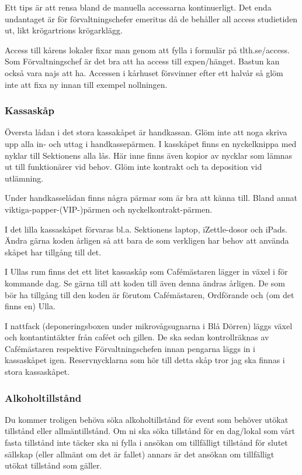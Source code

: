 \documentclass[10pt]{article}
\begin{document}
Ett tips är att rensa bland de manuella accessarna kontinuerligt. Det enda undantaget är för förvaltningschefer emeritus då de behåller all access studietiden ut, likt krögartrions krögarklägg.

Access till kårens lokaler fixar man genom att fylla i formulär på tlth.se/access. Som Förvaltningschef är det bra att ha access till expen/hänget. Bastun kan också vara najs att ha. Accessen i kårhuset försvinner efter ett halvår så glöm inte att fixa ny innan till exempel nollningen.

\subsubsection{Kassaskåp}
Översta lådan i det stora kassakåpet är handkassan. Glöm inte att noga skriva upp alla in- och uttag i handkassepärmen. I kasskåpet finns en nyckelknippa med nyklar till Sektionens alla lås. Här inne finns även kopior av nycklar som lämnas ut till funktionärer vid behov. Glöm inte kontrakt och ta deposition vid utlämning.

Under handkasselådan finns några pärmar som är bra att känna till. Bland annat viktiga-papper-(VIP-)pärmen och nyckelkontrakt-pärmen. 

I det lilla kassaskåpet förvaras bl.a. Sektionens laptop, iZettle-dosor och iPads. Ändra gärna koden årligen så att bara de som verkligen har behov att använda skåpet har tillgång till det. 

I Ullas rum finns det ett litet kassaskåp som Cafémästaren lägger in växel i för kommande dag. Se gärna till att koden till även denna ändras årligen. De som bör ha tillgång till den koden är förutom Cafémästaren, Ordförande och (om det finns en) Ulla.

I nattfack (deponeringsboxen under mikrovågsugnarna i Blå Dörren) läggs växel och kontantintäkter från caféet och gillen. De ska sedan kontrollräknas av Cafémästaren respektive Förvaltningschefen innan pengarna läggs in i kassaskåpet igen. 
Reservnycklarna som hör till detta skåp tror jag ska finnas i stora kassaskåpet.

\subsubsection{Alkoholtillstånd}
Du kommer troligen behöva söka alkoholtillstånd för event som behöver utökat tillstånd eller allmäntillstånd. Om ni ska söka tillstånd för en dag/lokal som vårt fasta tillstånd inte täcker ska ni fylla i ansökan om tillfälligt tillstånd för slutet sällskap (eller allmänt om det är fallet) annars är det ansökan om tillfälligt utökat tillstånd som gäller.
\end{document}

